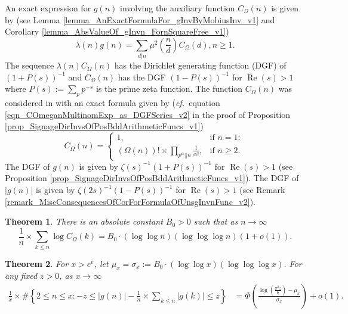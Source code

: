 \documentclass[11pt,reqno,a4letter]{article}
\newcommand{\hlocalref}[1]{\hyperref[#1]{\ref{#1}}}
\numberwithin{equation}{section}
\numberwithin{figure}{section}
\numberwithin{table}{section}
\newcommand{\cf}{\textit{cf.\ }}
\theoremstyle{plain}
\newtheorem{theorem}{Theorem}
\numberwithin{theorem}{section}
\theoremstyle{definition}
\renewcommand{\Re}{\operatorname{Re}}
\begin{document}
An exact expression for $g(n)$ involving the auxiliary function 
$C_{\Omega}(n)$ is given by 
(see Lemma \hlocalref{lemma_AnExactFormulaFor_gInvByMobiusInv_v1} and 
Corollary \hlocalref{lemma_AbsValueOf_gInvn_FornSquareFree_v1}) 
\begin{equation}
\label{eqn_gInvn_ExactDivisorSumFormula_WithSgnWeight_v1} 
\lambda(n) g(n) = \sum_{d|n} \mu^2\left(\frac{n}{d}\right) C_{\Omega}(d), n \geq 1. 
\end{equation}
The sequence $\lambda(n) C_{\Omega}(n)$ has the 
Dirichlet generating function (DGF) of $(1 + P(s))^{-1}$ and 
$C_{\Omega}(n)$ has the DGF $(1-P(s))^{-1}$ for $\Re(s) > 1$ 
where $P(s) := \sum_p p^{-s}$ is the prime zeta function. 
The function $C_{\Omega}(n)$ was considered in 
\cite{FROBERG-1968} with an exact formula given by 
(\cf equation \eqref{eqn_COmeganMultinomExp_as_DGFSeries_v2} in the 
proof of Proposition \hlocalref{prop_SignageDirInvsOfPosBddArithmeticFuncs_v1}) 
\begin{equation}
\label{eqn_proof_tag_hInvn_ExactNestedSumFormula_CombInterpetIdent_v3}
C_{\Omega}(n) = \begin{cases}
     1, & \text{if $n = 1$; } \\ 
     (\Omega(n))! \times \prod\limits_{p^{\alpha}||n} \frac{1}{\alpha!}, & \text{if $n \geq 2$. }
     \end{cases}
\end{equation} 
The DGF of $g(n)$ is given by $\zeta(s)^{-1} (1 + P(s))^{-1}$ for $\Re(s) > 1$ 
(see Proposition \hlocalref{prop_SignageDirInvsOfPosBddArithmeticFuncs_v1}). 
The DGF of $|g(n)|$ is given by $\zeta(2s)^{-1} (1 - P(s))^{-1}$ for $\Re(s) > 1$ 
(see Remark \hlocalref{remark_MiscConsequencesOfCorForFormulaOfUnsgInvnFunc_v2}). 

\begin{theorem} 
\label{lemma_HatCAstxSum_ExactFormulaWithError_v1} 
There is an absolute constant $B_0 > 0$ such that as $n \rightarrow \infty$ 
\[
\frac{1}{n} \times \sum_{k \leq n} \log C_{\Omega}(k) = 
     B_0 \cdot (\log\log n)(\log\log\log n) \left(1 + o(1)\right). 
\] 
\end{theorem} 

\begin{theorem}
\label{cor_CLT_VII}
For $x > e^e$, let $\mu_x = \sigma_x := B_0 \cdot (\log\log x)(\log\log\log x)$. 
For any fixed $z > 0$, as $x \rightarrow \infty$ 
\begin{align*} 
\frac{1}{x} \times \#\left\{2 \leq n \leq x: -z \leq |g(n)| - 
        \frac{1}{n} \times \sum_{k \leq n} |g(k)| \leq z\right\} & = 
        \Phi\left(\frac{\log\left(\frac{\pi^2 z}{6}\right) - \mu_x}{\sigma_x}\right) + o(1).
\end{align*} 
\end{theorem}
\end{document}
